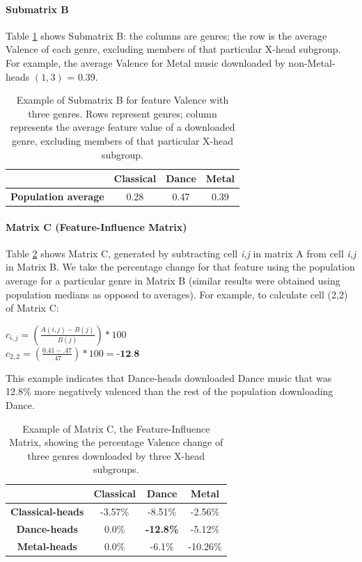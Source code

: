 \documentclass[a4paper]{article}
\begin{document}
\paragraph{Submatrix B}
Table \ref{tab:matB} shows Submatrix B: the columns are genres; the row is the average Valence of each genre, excluding members of that particular X-head subgroup. For example, the average Valence for Metal music downloaded by non-Metal-heads $(1,3)$ = 0.39.

\begin{table}[ht]
\centering
\begin{tabular}{|c|c|c|c|}
  \hline
\textbf{} & \textbf{Classical} & \textbf{Dance} & \textbf{Metal} \\
  \hline
\textbf{Population average} & 0.28 & 0.47 & 0.39\\
\hline
\end{tabular}
\caption[Submatrix B Example]{Example of Submatrix B for feature Valence with three genres. Rows represent genres; column represents the average feature value of a downloaded genre, excluding members of that particular X-head subgroup.\label{tab:matB}}
\end{table}


\paragraph{Matrix C (Feature-Influence Matrix)}
Table \ref{tab:matC} shows Matrix C, generated by subtracting cell \textit{i,j} in matrix A from cell \textit{i,j} in Matrix B. We take the percentage change for that feature using the population average for a particular genre in Matrix B (similar results were obtained using population medians as opposed to averages). For example, to calculate cell (2,2) of Matrix C:
\begin{center}
$\displaystyle c_{i,j} = (\frac{A(i,j)-B(j)}{B(j)} ) * 100$\\
\vspace{0.5cm}
$\displaystyle c_{2,2} = (\frac{0.41 - .47}{.47} ) * 100 = \textbf{-12.8}$
\end{center}

This example indicates that Dance-heads downloaded Dance music that was 12.8\% more negatively valenced than the rest of the population downloading Dance.

\begin{table}[ht]
\centering
\begin{tabular}{|c|c|c|c|}
  \hline
\textbf{} & \textbf{Classical} & \textbf{Dance} & \textbf{Metal} \\
  \hline
\textbf{Classical-heads} & -3.57\% & -8.51\% & -2.56\% \\
 \hline
\textbf{Dance-heads} & 0.0\% & \textbf{-12.8\%} & -5.12\% \\
 \hline
\textbf{Metal-heads} & 0.0\% & -6.1\% & -10.26\% \\
\hline
\end{tabular}
\caption[Matrix C Example]{Example of Matrix C, the Feature-Influence Matrix, showing the percentage Valence change of three genres downloaded by three X-head subgroups. \label{tab:matC}}
\end{table}
\end{document}
